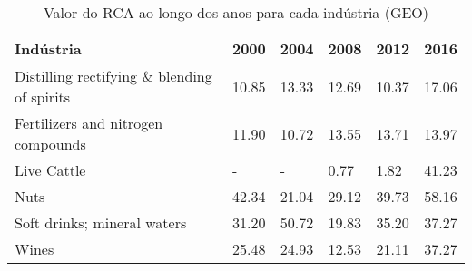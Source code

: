 \begin{table}
\centering
\caption{Valor do RCA ao longo dos anos para cada indústria (GEO)}
\begin{tabular}{p{6cm}p{1.5cm}p{1.5cm}p{1.5cm}p{1.5cm}p{1.5cm}}
\toprule
                                  Indústria &  2000 &  2004 &  2008 &  2012 &  2016 \\
\midrule
Distilling rectifying \& blending of spirits & 10.85 & 13.33 & 12.69 & 10.37 & 17.06 \\
         Fertilizers and nitrogen compounds & 11.90 & 10.72 & 13.55 & 13.71 & 13.97 \\
                                Live Cattle &     - &     - &  0.77 &  1.82 & 41.23 \\
                                       Nuts & 42.34 & 21.04 & 29.12 & 39.73 & 58.16 \\
                Soft drinks; mineral waters & 31.20 & 50.72 & 19.83 & 35.20 & 37.27 \\
                                      Wines & 25.48 & 24.93 & 12.53 & 21.11 & 37.27 \\
\bottomrule
\end{tabular}
\end{table}
